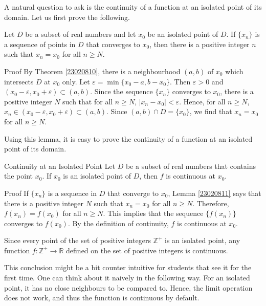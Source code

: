 A natural question to ask is the continuity of a function at an isolated point of its domain.  Let us first prove the following.
\begin{lemma}
[label=23020811]{}
Let $D$ be a subset of real numbers and let $x_0$ be an isolated point of $D$. If $\{x_n\}$ is a sequence of points in $D$ that converges to $x_0$, then there is a positive integer $n$ such that $x_n=x_0$ for all $n\geq N$.
\end{lemma}
\begin{myproof}{Proof}
By Theorem \ref{23020810},  there is a neighbourhood $(a, b)$ of $x_0$ which intersects $D$   at $x_0$ only.  
 Let $\varepsilon=\min\{x_0-a, b-x_0\}$. Then $\varepsilon>0$ and $ (x_0-\varepsilon, x_0+ \varepsilon)\subset (a,b)$. Since the sequence $\{x_n\}$ converges to $x_0$, there is a positive integer $N$ such that for all $n\geq N$, $|x_n-x_0|<\varepsilon$. Hence, for all $n\geq N$, $x_n\in (x_0-\varepsilon, x_0+ \varepsilon)\subset (a,b)$. Since $(a, b)\cap D=\{x_0\}$, we find that  $x_n=x_0$ for all $n\geq N$.
 
\end{myproof}

Using this lemma, it is easy to prove the continuity of a function at an isolated point of its domain. 
\begin{proposition}
{Continuity at an Isolated Point}
Let $D$ be a subset of real numbers that contains the point $x_0$. If $x_0$ is an isolated point of  $D$, then $f$ is continuous at $x_0$.
\end{proposition}
\begin{myproof}{Proof}
If $\{x_n\}$ is a sequence in $D$ that converge to $x_0$, Lemma \ref{23020811} says that there is a positive integer $N$ such that $x_n=x_0$ for all $n\geq N$.  Therefore, $f(x_n)=f(x_0)$ for all $n\geq N$.  This implies that the sequence $\{f(x_n)\}$ converges to $f(x_0)$. By the definition of continuity, $f$ is continuous at $x_0$.
\end{myproof}

\begin{example}{}
Since every point of the set of positive integers $\mathbb{Z}^+$ is an isolated point, any function $f:\mathbb{Z}^+\rightarrow \mathbb{R}$ defined on the set of positive integers is continuous.
\end{example}
This conclusion might be a bit counter intuitive for students that see it for the first time. One can think about it naively in the following way. For an isolated point, it has no close neighbours to be compared to. Hence, the limit operation does not work, and thus the function is continuous by default.

